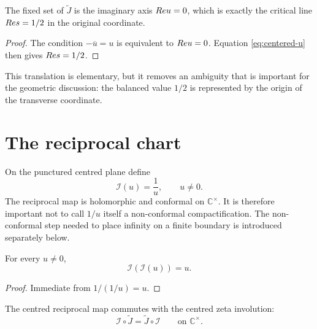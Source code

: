 \begin{proposition}
\label{prop:centered-fixed-locus}
The fixed set of $\widetilde J$ is the imaginary axis $Re u=0$, which is exactly the critical line $Re s=1/2$ in the original coordinate.
\end{proposition}

\begin{proof}
The condition $-\overline u=u$ is equivalent to $Re u=0$.  Equation \eqref{eq:centered-u} then gives $Re s=1/2$.
\end{proof}

This translation is elementary, but it removes an ambiguity that is important for the geometric discussion: the balanced value $1/2$ is represented by the origin of the transverse coordinate.

\section{The reciprocal chart}
On the punctured centred plane define
\begin{equation}
\mathcal I(u)=\frac1u,
\qquad u\neq0.
\label{eq:reciprocal}
\end{equation}
The reciprocal map is holomorphic and conformal on $\mathbb C^\times$.  It is therefore important not to call $1/u$ itself a non-conformal compactification.  The non-conformal step needed to place infinity on a finite boundary is introduced separately below.

\begin{proposition}
\label{prop:reciprocal-involution}
For every $u\neq0$,
\begin{equation}
\mathcal I(\mathcal I(u))=u.
\end{equation}
\end{proposition}

\begin{proof}
Immediate from $1/(1/u)=u$.
\end{proof}

\begin{proposition}
\label{prop:reciprocal-commutes}
The centred reciprocal map commutes with the centred zeta involution:
\begin{equation}
\mathcal I\circ\widetilde J
=
\widetilde J\circ\mathcal I
\qquad\text{on }\mathbb C^\times.
\label{eq:commutation}
\end{equation}
\end{proposition}


